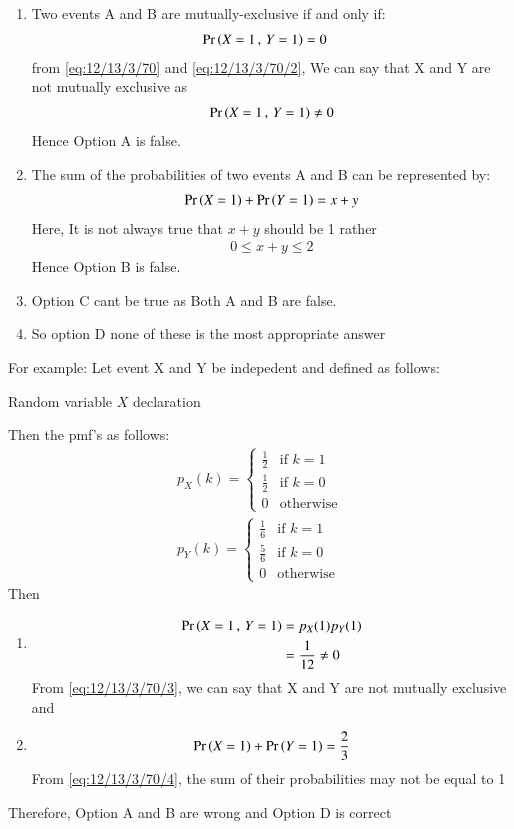 \documentclass[article]{IEEEtran}
\theoremstyle{remark}
\begin{document}
\begin{enumerate}
\item Two events A and B are mutually-exclusive if and only if:
\begin{align}
\pr{X=1\,,\,Y=1}&= 0 \label{eq:12/13/3/70/2}
\end{align}
from \eqref{eq:12/13/3/70} and \eqref{eq:12/13/3/70/2}, We can say that X and Y are not mutually exclusive as
\begin{align}
\Pr\left(X=1\,,\,Y=1\right) \neq 0 
\end{align}
Hence Option A is false.
\item The sum of the probabilities of two events A and B can be represented by:
\begin{align}
\Pr\left(X=1\right)+\Pr\left(Y=1\right) = x+y
\end{align}
Here, It is not always true that $x+y$ should be 1 rather 
\begin{align}
0 \le x+y \le 2 
\end{align}
Hence Option B is false.
\item Option C cant be true as Both A and B are false.
\item So option D none of these is the most appropriate answer 
\end{enumerate}
For example: Let event X and Y be indepedent and defined as follows:
\begin{table}[h]
	\centering
	
	\caption{Random variable $X$ declaration}
\end{table}
Then the pmf's as follows:
\begin{align}
p_X(k) = 
\begin{cases}
  \frac{1}{2} & \text{if } k = 1 \\
  \frac{1}{2} & \text{if } k = 0 \\
  0 & \text{otherwise}
\end{cases} \\
p_Y(k) = 
\begin{cases}
  \frac{1}{6} & \text{if } k = 1 \\
  \frac{5}{6} & \text{if } k = 0 \\
  0 & \text{otherwise}
\end{cases}
\end{align}
Then
\begin{enumerate}
\item \begin{align}
\pr{X=1\,,\,Y=1} &= p_X(1)p_Y(1) \\
&= \frac{1}{12} \neq 0 \label{eq:12/13/3/70/3}
\end{align}
From \eqref{eq:12/13/3/70/3}, we can say that X and Y are not mutually exclusive and 
\item \begin{align}
\pr{X=1}+\pr{Y=1} = \frac{2}{3} \label{eq:12/13/3/70/4}
\end{align}
From \eqref{eq:12/13/3/70/4}, the sum of their probabilities may not be equal to 1
\end{enumerate}
Therefore, Option A and B are wrong and Option D is correct
\end{document}
